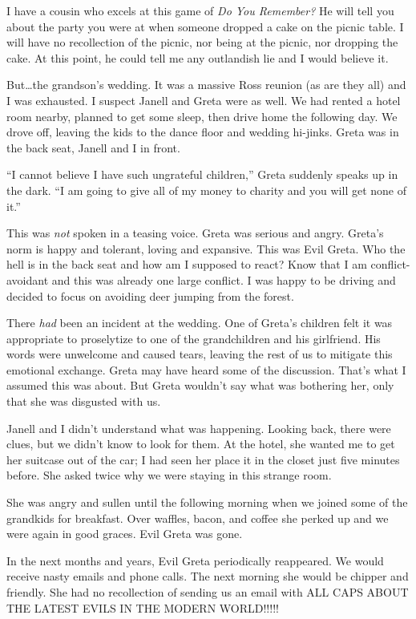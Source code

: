 \documentclass[
  letterpaper,
  DIV=11,
  numbers=noendperiod]{scrreprt}
\begin{document}
I have a cousin who excels at this game of \emph{Do You Remember?} He
will tell you about the party you were at when someone dropped a cake on
the picnic table. I will have no recollection of the picnic, nor being
at the picnic, nor dropping the cake. At this point, he could tell me
any outlandish lie and I would believe it.

But\ldots the grandson's wedding. It was a massive Ross reunion (as are
they all) and I was exhausted. I suspect Janell and Greta were as well.
We had rented a hotel room nearby, planned to get some sleep, then drive
home the following day. We drove off, leaving the kids to the dance
floor and wedding hi-jinks. Greta was in the back seat, Janell and I in
front.

``I cannot believe I have such ungrateful children,'' Greta suddenly
speaks up in the dark. ``I am going to give all of my money to charity
and you will get none of it.''

This was \emph{not} spoken in a teasing voice. Greta was serious and
angry. Greta's norm is happy and tolerant, loving and expansive. This
was Evil Greta. Who the hell is in the back seat and how am I supposed
to react? Know that I am conflict-avoidant and this was already one
large conflict. I was happy to be driving and decided to focus on
avoiding deer jumping from the forest.

There \emph{had} been an incident at the wedding. One of Greta's
children felt it was appropriate to proselytize to one of the
grandchildren and his girlfriend. His words were unwelcome and caused
tears, leaving the rest of us to mitigate this emotional exchange. Greta
may have heard some of the discussion. That's what I assumed this was
about. But Greta wouldn't say what was bothering her, only that she was
disgusted with us.

Janell and I didn't understand what was happening. Looking back, there
were clues, but we didn't know to look for them. At the hotel, she
wanted me to get her suitcase out of the car; I had seen her place it in
the closet just five minutes before. She asked twice why we were staying
in this strange room.

She was angry and sullen until the following morning when we joined some
of the grandkids for breakfast. Over waffles, bacon, and coffee she
perked up and we were again in good graces. Evil Greta was gone.

In the next months and years, Evil Greta periodically reappeared. We
would receive nasty emails and phone calls. The next morning she would
be chipper and friendly. She had no recollection of sending us an email
with ALL CAPS ABOUT THE LATEST EVILS IN THE MODERN WORLD!!!!!
\end{document}
